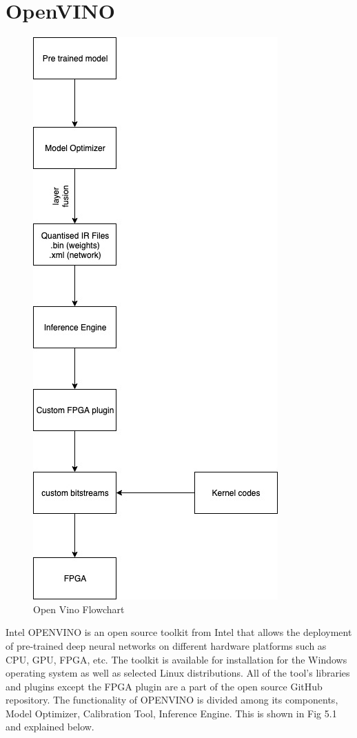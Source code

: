 \documentclass[titlepage]{report}
\begin{document}
\section{OpenVINO}
\begin{figure}[!]
    \centering
    \includegraphics[scale=0.65]{open_vino_flowchart.jpg}
    \caption{Open Vino Flowchart}
\end{figure}

Intel OPENVINO is an open source toolkit from Intel that allows the deployment of pre-trained deep neural networks on different hardware platforms such as CPU, GPU, FPGA, etc. The toolkit is available for installation for the Windows operating system as well as selected Linux distributions. All of the tool's libraries and plugins except the FPGA plugin are a part of the open source GitHub repository.
The functionality of OPENVINO is divided among its components, Model Optimizer, Calibration Tool,  Inference Engine. This is shown in Fig 5.1 and explained below. 
\end{document}

